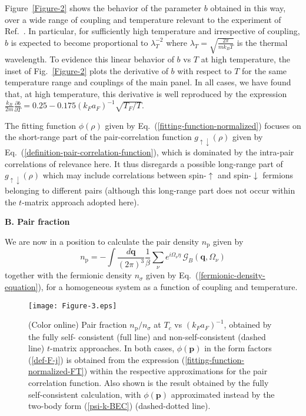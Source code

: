 \documentclass[pra,twocolumn,aps,amssymb,showpacs,superscriptaddress]{revtex4-1}
\begin{document}
Figure~\ref{Figure-2} shows the behavior of the parameter $b$ obtained in this way, over a wide range of coupling and temperature relevant to the experiment of Ref.~\cite{Ulm-Cam-2019}.
In particular, for sufficiently high temperature and irrespective of coupling, $b$ is expected to become proportional to $\lambda_{T}^{-2}$ where $\lambda_{T} = \sqrt{\frac{2\pi}{m k_{B} T}}$ is the thermal wavelength.
To evidence this linear behavior of $b$ vs $T$ at high temperature, the inset of Fig.~\ref{Figure-2} plots the derivative of $b$ with respect to $T$ for the same temperature range and couplings of the main panel. 
In all cases, we have found that, at high temperature, this derivative is well reproduced by the expression $\frac{k_{B}}{2m} \frac{\partial b}{\partial T} = 0.25 - 0.175 (k_{F}a_{F})^{-1} \sqrt{T_{F}/T}$.

The fitting function $\phi(\rho)$ given by Eq.~(\ref{fitting-function-normalized}) focuses on the short-range part of the pair-correlation function
$g_{\uparrow \downarrow}(\rho)$ given by Eq.~(\ref{definition-pair-correlation-function}), which is dominated by the intra-pair correlations of relevance here.
It thus disregards a possible long-range part of $g_{\uparrow \downarrow}(\rho)$ which may include correlations between spin-$\uparrow$ and spin-$\downarrow$ fermions
belonging to different pairs (although this long-range part does not occur within the $t$-matrix approach adopted here).

\vspace{0.05cm}
\begin{center}
{\bf B. Pair fraction}
\end{center}

We are now in a position to calculate the pair density $n_{\mathrm{p}}$ given by
\begin{equation}
n_{\mathrm{p}} = - \int \! \frac{d\mathbf{q}}{(2 \pi)^{3}} \frac{1}{\beta} \sum_{\nu} e^{i \Omega_{\nu} \eta} \, \mathcal{G}_{B}(\mathbf{q},\Omega_{\nu}) 
\label{bosonic-density-homogeneous}
\end{equation}
together with the fermionic density $n_{\sigma}$ given by Eq.~(\ref{fermionic-density-equation}), for a homogeneous system as a function of coupling and temperature.

\begin{figure}[t]
\begin{center}
\texttt{[image: Figure-3.eps]}
\caption{(Color online) Pair fraction $n_{\mathrm{p}}/n_{\sigma}$ at $T_{c}$ vs $(k_{F} a_{F})^{-1}$, obtained by the fully self- consistent (full line) and non-self-consistent (dashed line) $t$-matrix approaches.
                                     In both cases, $\phi(\mathbf{p})$ in the form factors (\ref{def-F-j}) is obtained from the expression (\ref{fitting-function-normalized-FT}) within the respective approximations for the pair
                                     correlation function.
                                    Also shown is the result obtained by the fully self-consistent calculation, with $\phi(\mathbf{p})$ approximated instead by the two-body form (\ref{psi-k-BEC}) (dashed-dotted line).}
\label{Figure-3}
\end{center}
\end{figure} 
\end{document}
